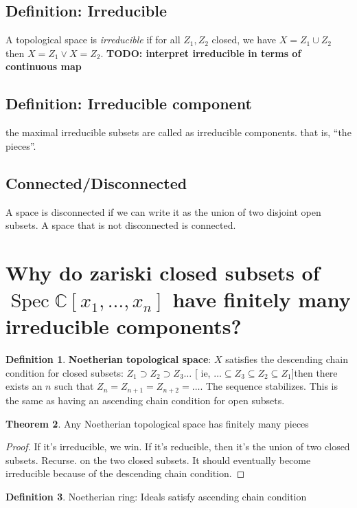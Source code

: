 \documentclass{book}
\newcommand{\C}{\ensuremath{\mathbb{C}}}
\newcommand{\spec}{\operatorname{Spec}}
\theoremstyle{definition}
\newtheorem{theorem}{Theorem}
\newtheorem{definition}[theorem]{Definition}
\begin{document}
\subsection{Definition: Irreducible}
A topological space is \emph{irreducible} if
for all $Z_1, Z_2$ closed, we have
$X = Z_1 \cup Z_2$
then $X = Z_1 \lor X = Z_2$.
\textbf{TODO: interpret irreducible in terms of continuous map}


\subsection{Definition: Irreducible component}
the maximal irreducible subsets are called as irreducible components.
that is, ``the pieces''.

\subsection{Connected/Disconnected}
A space is disconnected if we can write it as the union of two disjoint
open subsets. A space that is not disconnected is connected.

\section{Why do zariski closed subsets of $\spec \C[x_1, \dots, x_n]$ have
finitely many irreducible components?}

\begin{definition}
\textbf{Noetherian topological space}: $X$ satisfies the descending chain
condition for closed subsets: $Z_1 \supset Z_2 \supset Z_3 \dots$ [
ie, $\dots \subseteq Z_3 \subseteq Z_2 \subseteq Z_1$]then there
exists an $n$ such that $Z_n = Z_{n+1} = Z_{n+2} = \dots$. The sequence
stabilizes. This is the same as having an ascending
chain condition for open subsets.
\end{definition}

\begin{theorem}
Any Noetherian topological space has finitely many pieces
\end{theorem}
\begin{proof}
If it's irreducible, we win. If it's reducible, then it's the
union of two closed subsets. Recurse. on the two closed subsets.
It should eventually become irreducible because of the descending chain
condition. 
\end{proof}

\begin{definition}
Noetherian ring: Ideals satisfy ascending chain condition
\end{definition}
\end{document}
